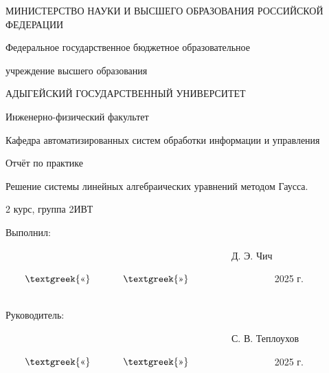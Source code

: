 \documentclass{article}
\date{2025-06-04}
\begin{document}
МИНИСТЕРСТВО НАУКИ И ВЫСШЕГО ОБРАЗОВАНИЯ РОССИЙСКОЙ ФЕДЕРАЦИИ

Федеральное государственное бюджетное образовательное

учреждение высшего образования

АДЫГЕЙСКИЙ ГОСУДАРСТВЕННЫЙ УНИВЕРСИТЕТ


\bigskip

Инженерно-физический факультет

Кафедра автоматизированных систем обработки информации и управления


\bigskip


\bigskip


\bigskip

Отчёт по практике

Решение системы линейных алгебраических уравнений методом Гаусса.


\bigskip

2 курс, группа 2ИВТ


\bigskip


\bigskip


\bigskip


\bigskip


\bigskip


\bigskip

Выполнил: \ \ \ \ \ \ \ \ \ \ \ \ \ \ \ \ \ \ \ \ \ \ \ \ \ \ \ \ \ \ \ \ \ \ \ \ \ \ \ \ \ 

\ \ \ \ \ \ \ \ \ \ \ \ \ \  \ \ \ \ \ \ \ \ \ \ \  \ \ \ \ \ \ \ \ \ \ \ \ \ \ \ \ \ \ \ \ \ \ Д. Э. Чич

\ \ \ \ $\text{\textgreek{«}}$ \ \ \ \ \ \ $\text{\textgreek{»}}$ \ \ \ \ \ \ \ \ \ \ \ \ \ \ \ \ \ 2025 г.
\ \ \ \ \ \ \ \ \ \ \ \ \ \ \ \ \ \ \ 


\bigskip


\bigskip

Руководитель: \ \ \ \ \ \ \ \ \ \ \ \ \ \ \ \ \ \ \ \ \ \ \ \ \ \ \ \ \ \ \ \ \ \ \ \ 

\ \ \ \ \ \ \ \ \ \ \ \ \ \  \ \ \ \ \ \ \ \ \ \ \  \ \ \ \ \ \ \ \ \ \ \ \ \ \ \ \ \ \ \ \ \ \ С. В. Теплоухов

\ \ \ \ $\text{\textgreek{«}}$ \ \ \ \ \ \ $\text{\textgreek{»}}$ \ \ \ \ \ \ \ \ \ \ \ \ \ \ \ \ \ 2025 г.
\ \ \ \ \ \ \ \ \ \ \ \ \ \ \ \ \ \ \ 


\bigskip


\bigskip


\bigskip


\bigskip


\bigskip
\end{document}
